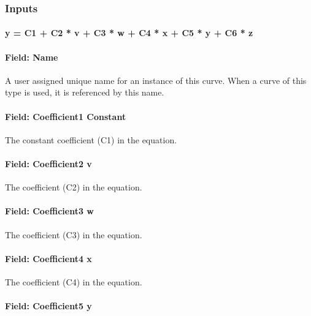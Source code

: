 \subsubsection{Inputs}\label{inputs-2-050}

\paragraph{y = C1 + C2 * v + C3 * w + C4 * x + C5 * y + C6 * z}\label{y-c1-c2-v-c3-w-c4-x-c5-y-c6-z}

\paragraph{Field: Name}\label{field-name-2-046}

A user assigned unique name for an instance of this curve. When a curve of this type is used, it is referenced by this name.

\paragraph{Field: Coefficient1 Constant}\label{field-coefficient1-constant-11}

The constant coefficient (C1) in the equation.

\paragraph{Field: Coefficient2 v}\label{field-coefficient2-v}

The coefficient (C2) in the equation.

\paragraph{Field: Coefficient3 w}\label{field-coefficient3-w}

The coefficient (C3) in the equation.

\paragraph{Field: Coefficient4 x}\label{field-coefficient4-x}

The coefficient (C4) in the equation.

\paragraph{Field: Coefficient5 y}\label{field-coefficient5-y-2}

